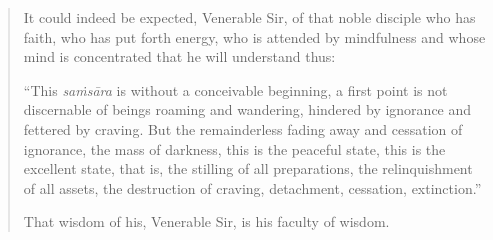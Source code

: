 \begin{quote}
It could indeed be expected, Venerable Sir, of that noble disciple who has faith, who has put forth energy, who is attended by mindfulness and whose mind is concentrated that he will understand thus:

``This \emph{saṁsāra} is without a conceivable beginning, a first point is not discernable of beings roaming and wandering, hindered by ignorance and fettered by craving. But the remainderless fading away and cessation of ignorance, the mass of darkness, this is the peaceful state, this is the excellent state, that is, the stilling of all preparations, the relinquishment of all assets, the destruction of craving, detachment, cessation, extinction.''

That wisdom of his, Venerable Sir, is his faculty of wisdom.
\end{quote}
